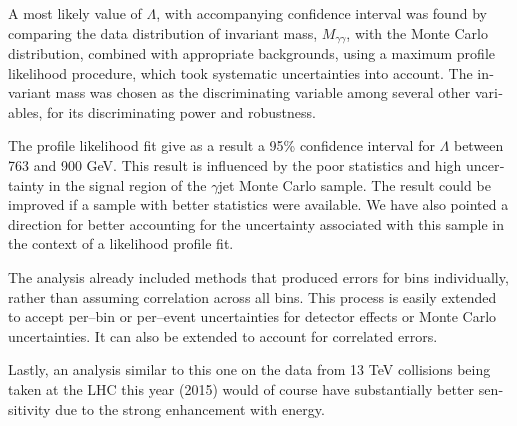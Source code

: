 \begin{english}
A most likely value of $\Lambda$, with accompanying confidence interval was found by comparing the data distribution of invariant mass, $M_{\gamma\gamma}$, with the Monte Carlo distribution, combined with appropriate backgrounds, using a maximum profile likelihood procedure, which took systematic uncertainties into account. The invariant mass was chosen as the discriminating variable among several other variables, for its discriminating power and robustness.

The profile likelihood fit give as a result a 95\% confidence interval for $\Lambda$ between 763 and 900 GeV. This result is influenced by the poor statistics and high uncertainty in the signal region of the \atlas{} $\gamma$jet Monte Carlo sample. The result could be improved if a sample with better statistics were available. We have also pointed a direction for better accounting for the uncertainty associated with this sample in the context of a likelihood profile fit.

The analysis already included methods that produced errors for bins individually, rather than assuming correlation across all bins. This process is easily extended to accept per--bin or per--event uncertainties for detector effects or Monte Carlo uncertainties. It can also be extended to account for correlated errors.

Lastly, an analysis similar to this one on the data from 13 TeV collisions being taken at the LHC this year (2015) would of course have substantially better sensitivity due to the strong enhancement with energy.

\printbibliography[title=References]



\end{english}

